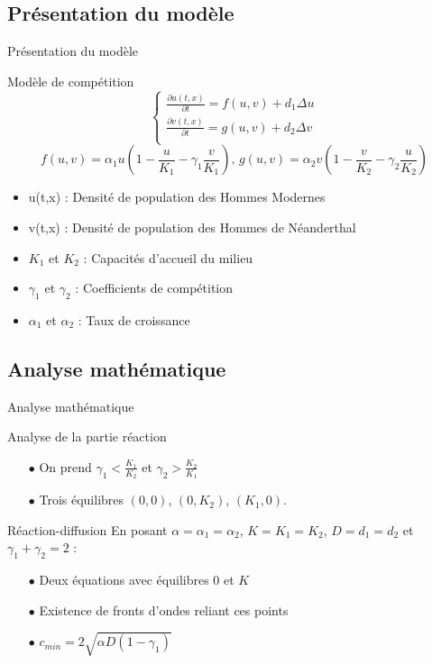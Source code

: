 \documentclass[10pt]{beamer}
\begin{document}
\subsection{Présentation du modèle}
\begin{frame}{Présentation du modèle}{}
\begin{block}{Modèle de compétition}
	$$\begin{cases} \frac{\partial u(t,x)}{\partial t} = f(u,v) + d_1\Delta u\\ \frac{\partial v(t,x)}{\partial t} = g(u,v) + d_2 \Delta v \\ 
\end{cases}$$
	$$f(u,v) = \alpha_1 u\left(1-\frac{u}{K_1}-\gamma_1\frac{v}{K_1}\right) \text{, } g(u,v) = \alpha_2 v\left(1-\frac{v}{K_2}-\gamma_2\frac{u}{K_2}\right)$$
\end{block}
\begin{itemize}
	\item u(t,x) : Densité de population des Hommes Modernes 
    \item v(t,x) : Densité de population des Hommes de Néanderthal 
    \item $K_1$ et $K_2$ : Capacités d'accueil du milieu
    \item $\gamma_1$ et $\gamma_2$ : Coefficients de compétition
    \item $\alpha_1$ et $\alpha_2$ : Taux de croissance
\end{itemize}
\end{frame}

\subsection{Analyse mathématique}
\begin{frame}{Analyse mathématique}{}

\begin{block}{Analyse de la partie réaction}
\begin{itemize}
\item[$\bullet$] On prend $\gamma_1 < \frac{K_1}{K_2}$ et $\gamma_2 > \frac{K_2}{K_1}$\\
\item[$\bullet$] Trois équilibres $(0,0)$, $(0,K_2)$, $(K_1,0)$.
\end{itemize}
\end{block}

\begin{block}{Réaction-diffusion}
En posant $\alpha = \alpha_1 = \alpha_2$, $K = K_1 = K_2$, $D = d_1 = d_2$ et $\gamma_1 + \gamma_2 = 2$ :
\begin{itemize}
\item[$\bullet$] Deux équations avec équilibres $0$ et $K$
\item[$\bullet$] Existence de fronts d'ondes reliant ces points
\item[$\bullet$] $c_{min} = 2 \sqrt{\alpha D(1-\gamma_1)}$
\end{itemize}
\end{block}
\end{frame}
\end{document}
